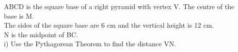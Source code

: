 \documentclass[preview]{standalone}
\begin{document}
\begin{center}
\begin{minipage}{12cm}\raggedright ABCD is the square base of a right pyramid with vertex V. The centre of the base is M.\\ The sides of the square base are 6 cm and the vertical height is 12 cm.\\ N is the midpoint of BC.\\ i) Use the Pythagorean Theorem to find the distance VN.\end{minipage}
\end{center}
\end{document}

